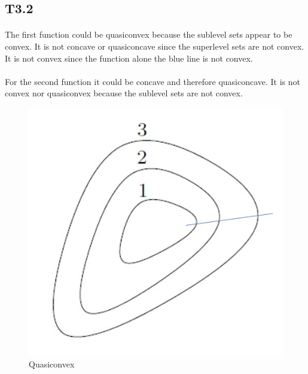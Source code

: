 \subsection*{T3.2}
\paragraph{}
The first function could be quasiconvex because the sublevel sets appear to be convex. It is not concave or quasiconcave since the superlevel sets are not convex. It is not convex since the function alone the blue line is not convex.
\paragraph{}
For the second function it could be concave and therefore quasiconcave. It is not convex nor quasiconvex because the sublevel sets are not convex. 
\begin{figure}[h]
	\centering
	\includegraphics[scale=0.5]{quasiconvex}
	\caption{Quasiconvex}
\end{figure}
